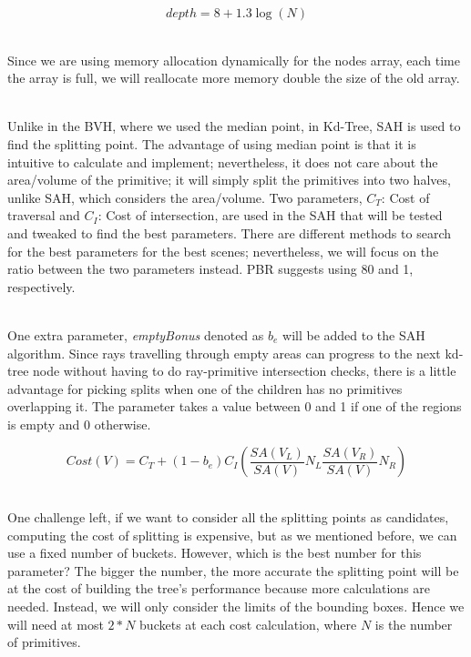 \documentclass[11pt,a4paper]{article}
\begin{document}
\begin{equation}
depth = 8 + 1.3\log(N)
\label{eq:depth}
\end{equation}

\noindent
\\
Since we are using memory allocation dynamically for the nodes array, each time the array is full, we will reallocate more memory double the size of the old array.

\noindent
\\
Unlike in the BVH, where we used the median point, in Kd-Tree, SAH is used to find the splitting point. The advantage of using median point is that it is intuitive to calculate and implement; nevertheless, it does not care about the area/volume of the primitive; it will simply split the primitives into two halves, unlike SAH, which considers the area/volume. Two parameters, $C_T$: Cost of traversal and $C_I$: Cost of intersection, are used in the SAH that will be tested and tweaked to find the best parameters. There are different methods to search for the best parameters for the best scenes; nevertheless, we will focus on the ratio between the two parameters instead. PBR suggests using 80 and 1, respectively.


\noindent
\\
One extra parameter, \textit{emptyBonus} denoted as $b_e$ will be added to the SAH algorithm. Since rays travelling through empty areas can progress to the next kd-tree node without having to do ray-primitive intersection checks, there is a little advantage for picking splits when one of the children has no primitives overlapping it. The parameter takes a value between 0 and 1 if one of the regions is empty and 0 otherwise. 



\begin{equation}
Cost(V) = C_T + (1-b_e)C_I(\frac{SA(V_L)}{SA(V)}N_L \frac{SA(V_R)}{SA(V)}N_R)
\end{equation}

\noindent
\\
One challenge left, if we want to consider all the splitting points as candidates, computing the cost of splitting is expensive, but as we mentioned before, we can use a fixed number of buckets. However, which is the best number for this parameter? The bigger the number, the more accurate the splitting point will be at the cost of building the tree's performance because more calculations are needed. Instead, we will only consider the limits of the bounding boxes. Hence we will need at most $2 * N$ buckets at each cost calculation, where $N$ is the number of primitives.
\end{document}
